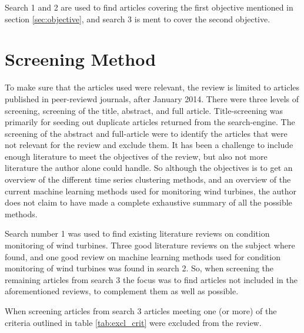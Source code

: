 Search 1 and 2 are used to find articles covering the first objective mentioned in section \ref{sec:objective}, and search 3 is ment to cover the second objective.
\section{Screening Method} \label{sec:screening}
To make sure that the articles used were relevant, the review is limited to articles published in peer-reviewd journals, after January 2014. 
There were three levels of screening, screening of the title, abstract, and full article. 
Title-screening was primarily for seeding out duplicate articles returned from the search-engine. 
The screening of the abstract and full-article were to identify the articles that were not relevant for the review and exclude them. 
It has been a challenge to include enough literature to meet the objectives of the review, but also not more literature the author alone could handle. 
So although the objectives is to get an overview of the different time series clustering methods, and an overview of the current machine learning methods used for monitoring wind turbines, the author does not claim to have made a complete exhaustive summary of all the possible methods. \bigskip

Search number 1 was used to find existing literature reviews on condition monitoring of wind turbines. 
Three good literature reviews on the subject where found, and one good review on machine learning methods used for condition monitoring of wind turbines was found in search 2. 
So, when screening the remaining articles from search 3 the focus was to find articles not included in the aforementioned reviews, to complement them as well as possible. \bigskip

When screening articles from search 3 articles meeting one (or more) of the criteria outlined in table \ref{tab:excl_crit} were excluded from the review.

